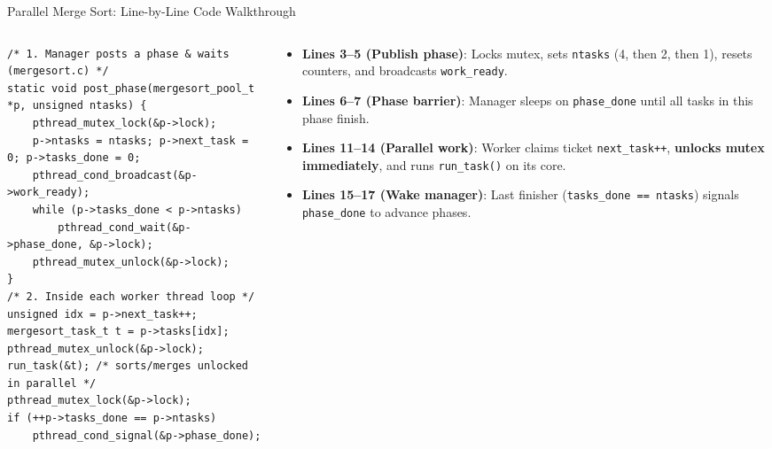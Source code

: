 \begin{frame}[fragile]{Parallel Merge Sort: Line-by-Line Code Walkthrough}
  \begin{columns}[t, onlytextwidth]
    \begin{column}{0.53\textwidth}
\begin{lstlisting}
/* 1. Manager posts a phase & waits (mergesort.c) */
static void post_phase(mergesort_pool_t *p, unsigned ntasks) {
    pthread_mutex_lock(&p->lock);
    p->ntasks = ntasks; p->next_task = 0; p->tasks_done = 0;
    pthread_cond_broadcast(&p->work_ready);
    while (p->tasks_done < p->ntasks)
        pthread_cond_wait(&p->phase_done, &p->lock);
    pthread_mutex_unlock(&p->lock);
}
/* 2. Inside each worker thread loop */
unsigned idx = p->next_task++;
mergesort_task_t t = p->tasks[idx];
pthread_mutex_unlock(&p->lock);
run_task(&t); /* sorts/merges unlocked in parallel */
pthread_mutex_lock(&p->lock);
if (++p->tasks_done == p->ntasks)
    pthread_cond_signal(&p->phase_done);
\end{lstlisting}
    \end{column}
    \begin{column}{0.44\textwidth}
      \smalltext\compactitem
      \begin{itemize}
        \item \textbf{Lines 3--5 (Publish phase)}: Locks mutex, sets \texttt{ntasks} (4, then 2, then 1), resets counters, and broadcasts \texttt{work\_ready}.
        \item \textbf{Lines 6--7 (Phase barrier)}: Manager sleeps on \texttt{phase\_done} until all tasks in this phase finish.
        \item \textbf{Lines 11--14 (Parallel work)}: Worker claims ticket \texttt{next\_task++}, \textbf{unlocks mutex immediately}, and runs \texttt{run\_task()} on its core.
        \item \textbf{Lines 15--17 (Wake manager)}: Last finisher (\texttt{tasks\_done == ntasks}) signals \texttt{phase\_done} to advance phases.
      \end{itemize}
    \end{column}
  \end{columns}
\end{frame}

